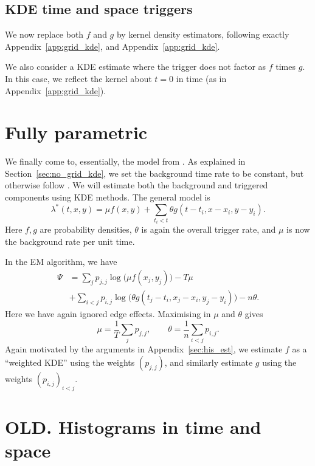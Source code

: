 \documentclass[twoside,a4paper]{article}
\theoremstyle{plain}
\theoremstyle{definition}
\begin{document}
\subsection{KDE time and space triggers}

We now replace both $f$ and $g$ by kernel density estimators, following exactly
Appendix~\ref{app:grid_kde}, and Appendix~\ref{app:grid_kde}.

We also consider a KDE estimate where the trigger does not factor as $f$ times $g$.
In this case, we reflect the kernel about $t=0$ in time (as in Appendix~\ref{app:grid_kde}).




\section{Fully parametric}

We finally come to, essentially, the model from \cite{sepp2}.
As explained in Section~\ref{sec:no_grid_kde}, we set the background time rate to
be constant, but otherwise follow \cite{sepp2}.
We will estimate both the background and triggered components using KDE methods.
The general model is
\[ \lambda^*(t,x,y) = \mu f(x,y) + \sum_{t_i<t} \theta g(t-t_i, x-x_i, y-y_i). \]
Here $f,g$ are probability densities, $\theta$ is again the overall trigger rate,
and $\mu$ is now the background rate per unit time.

In the EM algorithm, we have
\begin{align*} \Psi &= \sum_j p_{j,j} \log\big(\mu f(x_j,y_j)\big) - T\mu \\
&+ \sum_{i<j} p_{i,j} \log\big( \theta g(t_j-t_i, x_j-x_i, y_j-y_i) \big) - n\theta.
\end{align*}
Here we have again ignored edge effects.
Maximising in $\mu$ and $\theta$ gives
\[ \mu = \frac{1}{T} \sum_j p_{j,j}, \qquad
\theta = \frac1n \sum_{i<j} p_{i,j}. \]
Again motivated by the arguments in Appendix~\ref{sec:his_est}, we estimate $f$ as a
``weighted KDE'' using the weights $(p_{j,j})$, and similarly estimate $g$ using the
weights $(p_{i,j})_{i<j}$.







\section{OLD.  Histograms in time and space}
\end{document}
